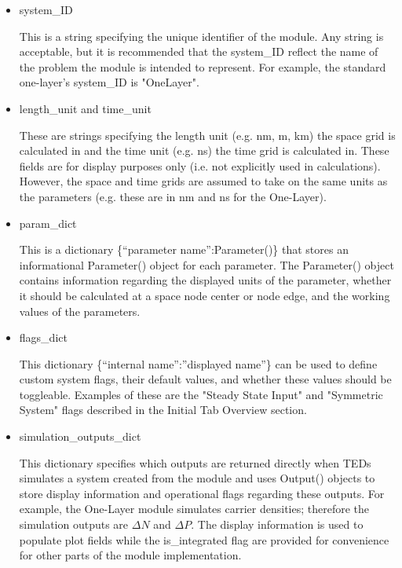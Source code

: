 \documentclass[11pt,letterpaper,titlepage]{article}
\begin{document}
		\begin{itemize}
			\item system\_ID
			\par This is a string specifying the unique identifier of the module. Any string is acceptable, but it is recommended that the system\_ID reflect the name of the problem the module is intended to represent. For example, the standard one-layer's system\_ID is "OneLayer".
			
			\item length\_unit and time\_unit
			\par These are strings specifying the length unit (e.g. nm, m, km) the space grid is calculated in and the time unit (e.g. ns) the time grid is calculated in. These fields are for display purposes only (i.e. not explicitly used in calculations). However, the space and time grids are assumed to take on the same units as the parameters (e.g. these are in nm and ns for the One-Layer).
			
			\item param\_dict
			\par This is a dictionary \{“parameter name”:Parameter()\} that stores an informational Parameter() object for each parameter. The Parameter() object contains information regarding the displayed units of the parameter, whether it should be calculated at a space node center or node edge, and the working values of the parameters.
			
			\item flags\_dict
			\par This dictionary  \{“internal name”:”displayed name”\} can be used to define custom system flags, their default values, and whether these values should be toggleable. Examples of these are the "Steady State Input" and "Symmetric System" flags described in the Initial Tab Overview section.
			
			\item simulation\_outputs\_dict
			\par This dictionary specifies which outputs are returned directly when TEDs simulates a system created from the module and uses Output() objects to store display information and operational flags regarding these outputs. For example, the One-Layer module simulates carrier densities; therefore the simulation outputs are $\Delta N$ and $\Delta P$. The display information is used to populate plot fields while the is\_integrated flag are provided for convenience for other parts of the module implementation.
			

\end{itemize}
\end{document}
